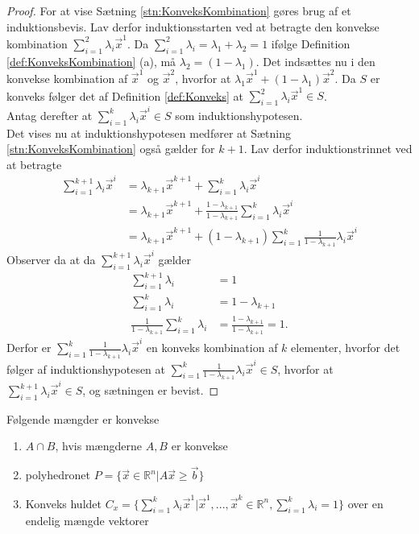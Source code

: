 \begin{proof}
For at vise Sætning \ref{stn:KonveksKombination} gøres brug af et induktionsbevis.
Lav derfor induktionsstarten ved at betragte den konvekse kombination $\sum_{i=1}^2 \lambda_i \vec{x}^1$.
Da $\sum_{i=1}^2 \lambda_i = \lambda_1 + \lambda_2 = 1$ ifølge Definition \ref{def:KonveksKombination} (a), må $\lambda_2 = (1 - \lambda_1)$.
Det indsættes nu i den konvekse kombination af $\vec{x}^1$ og $\vec{x}^2$, hvorfor at $\lambda_1 \vec{x}^1+ (1-\lambda_1) \vec{x}^2$.
Da $S$ er konveks følger det af Definition \ref{def:Konveks} at $\sum_{i=1}^2 \lambda_i \vec{x}^1 \in S$.
\\Antag derefter at $\sum_{i=1}^k \lambda_i \vec{x}^i \in S$ som induktionshypotesen.
\\ Det vises nu at induktionshypotesen medfører at Sætning \ref{stn:KonveksKombination} også gælder for $k+1$.
Lav derfor induktionstrinnet ved at betragte 
\begin{align*}
	\sum_{i=1}^{k+1} \lambda_i \vec{x}^i &= \lambda_{k+1}\vec{x}^{k+1} + \sum_{i=1}^k \lambda_i \vec{x}^i
	\\ &= \lambda_{k+1}\vec{x}^{k+1} + \frac{1-\lambda_{k+1}}{1-\lambda_{k+1}} \sum_{i=1}^k \lambda_i \vec{x}^i
	\\ &= \lambda_{k+1}\vec{x}^{k+1} + (1-\lambda_{k+1}) \sum_{i=1}^k \frac{1}{1-\lambda_{k+1}} \lambda_i \vec{x}^i
\end{align*}
Observer da at da $\sum_{i=1}^{k+1} \lambda_i \vec{x}^i $ gælder
\begin{align*}
	\sum_{i=1}^{k+1} \lambda_i  & = 1
	\\ \sum_{i=1}^{k} \lambda_i &= 1 - \lambda_{k+1}
	\\ \frac{1}{1-\lambda_{k+1}} \sum_{i=1}^{k} \lambda_i &= \frac{1-\lambda_{k+1}}{1-\lambda_{k+1}} = 1.
\end{align*}
Derfor er $\sum_{i=1}^k \frac{1}{1-\lambda_{k+1}} \lambda_i \vec{x}^i$ en konveks kombination af $k$ elementer, hvorfor det følger af induktionshypotesen at $\sum_{i=1}^k \frac{1}{1-\lambda_{k+1}} \lambda_i \vec{x}^i \in S$, hvorfor at $\sum_{i=1}^{k+1} \lambda_i \vec{x}^i \in S$, og sætningen er bevist.
\end{proof}


\begin{stn}
Følgende mængder er konvekse
\begin{enumerate}[label=(\alph*)]
\item $A \cap B$, hvis mængderne $A,B$ er konvekse
\\  \item polyhedronet $P =\{ \vec{x} \in \mathds{R}^n | A \vec{x} \geq \vec{b}\} $
\\ \item Konveks huldet $C_x = \{\sum_{i=1}^k \lambda_i \vec{x}^1| \vec{x}^1, ...,\vec{x}^k \in \mathds{R}^n, \sum_{i=1}^k \lambda_i =1\}$ over en endelig mængde vektorer
\end{enumerate}
\end{stn}


